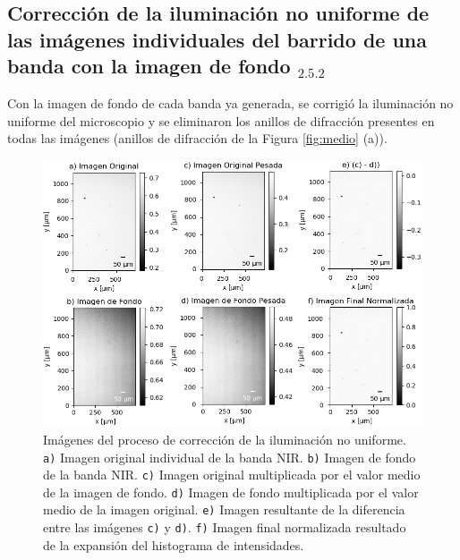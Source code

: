 	
\singlespacing
\subsection{Corrección de la iluminación no uniforme de las imágenes individuales del barrido de una banda con la imagen de fondo \href{https://github.com/jrr1984/defects_analysis/blob/master/bg_normalization.py}{\faGithub$_{2.5.2}$}}
\label{subs:nm}

\hspace{0.5cm} Con la imagen de fondo de cada banda ya generada, se corrigió la iluminación no uniforme del microscopio \cite{Nordenfelt} y se eliminaron los anillos de difracción presentes en todas las imágenes (anillos de difracción de la Figura \ref{fig:medio} (a)).
\begin{figure}[H]
	\centering
\includegraphics[scale=0.98]{Figs/defectosZEISS/correccionilum/NIR/1.png}
\caption{Imágenes del proceso de corrección de la iluminación no uniforme. \texttt{a)} Imagen original individual de la banda NIR. \texttt{b)} Imagen de fondo de la banda NIR. \texttt{c)} Imagen original multiplicada por el valor medio de la imagen de fondo. \texttt{d)} Imagen de fondo multiplicada por el valor medio de la imagen original. \texttt{e)} Imagen resultante de la diferencia entre las imágenes \texttt{c)} y \texttt{d)}. \texttt{f)} Imagen final normalizada resultado de la expansión del histograma de intensidades.}
\label{fig:correcilumims}
\end{figure}

